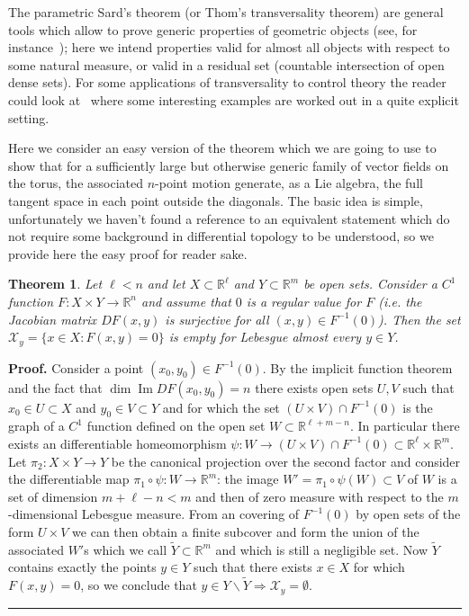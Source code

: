 \documentclass[11pt,a4paper]{article}%
\newtheorem{theorem}{Theorem}
\newenvironment{proof}[1][Proof]{\textbf{#1.} }{\ \rule{0.5em}{0.5em}}
\newcommand{\tmop}[1]{\ensuremath{\operatorname{#1}}}
\begin{document}
The parametric Sard's theorem (or Thom's transversality theorem) are  general
tools which allow to prove generic properties of geometric objects (see, for
instance~\cite{GuPol}); here we intend properties valid for almost all objects
with respect to some natural measure, or valid in a residual set (countable
intersection of open dense sets). For some applications of transversality to control theory the reader could look at~\cite{KSD} where some interesting examples are worked out in a quite explicit setting.

Here we consider an easy version of the theorem which
we are going to use to show that for a sufficiently large but otherwise
generic family of vector fields on the torus, the associated $n$-point motion
generate, as a Lie algebra, the full tangent space in each point outside the diagonals.
The basic idea is simple,  unfortunately we haven't found a reference to an equivalent statement which do not require some background in differential topology to be understood, so
we provide here the easy proof for reader sake.


\begin{theorem}
\label{th:transv}  Let $\ell< n$ and let $X \subset\mathbb{R}^{\ell}$ and $Y
\subset\mathbb{R}^{m}$ be open sets.  Consider a $C^{1}$ function $F : X
\times Y \rightarrow\mathbb{R}^{n}$  and assume that $0$ is a \emph{regular
value} for $F$ (i.e. the Jacobian matrix $D F  (x, y)$ is surjective for all
$(x, y) \in F^{- 1} (0)$). Then the set  $\mathcal{X}_{y} =  \{x \in X : F (x,
y) = 0\}$ is empty for Lebesgue almost every  $y \in Y$.
\end{theorem}


\begin{proof}
 Consider a point $(x_0, y_0) \in F^{- 1} (0)$. By the implicit function theorem
 and the fact that $\tmop{dim} \tmop{Im} DF (x_0, y_0) = n$ there exists open sets
$U, V$ such that  $x_0 \in U \subset X$ and $y_0 \in V \subset Y$ and for which
the set $(U \times V) \cap F^{- 1} (0)$ is the graph of a $C^1$ function defined on the open set
$W \subset \mathbb{R}^{\ell + m - n}$. In particular there exists an differentiable
homeomorphism $\psi : W \rightarrow
 (U \times V) \cap F^{- 1} (0) \subset \mathbb{R}^{\ell} \times
 \mathbb{R}^m$. Let $\pi_2 : X \times Y \rightarrow
 Y$ be the canonical projection over the second factor and consider the differentiable map $\pi_1 \circ \psi : W \rightarrow
 \mathbb{R}^m$: the image $W' = \pi_1 \circ \psi (W) \subset V$ of $W$ is a set of dimension
 $m + \ell - n < m$ and then of zero measure with respect to the $m$-dimensional Lebesgue measure.
 From an covering of $F^{- 1}
 (0)$ by open sets of the form $U \times V$ we can then obtain a finite subcover and form the union of the associated $W'$s which we call
 $\tilde{Y} \subset \mathbb{R}^m$ and which is still a negligible set. Now
 $\tilde{Y}$ contains exactly the points $y \in Y$ such that there exists $x \in X$ for which
  $F (x, y) = 0$, so we conclude that $y \in Y \backslash \tilde{Y} \Rightarrow
 \mathcal{X}_y = \emptyset$.
\end{proof}
\end{document}
